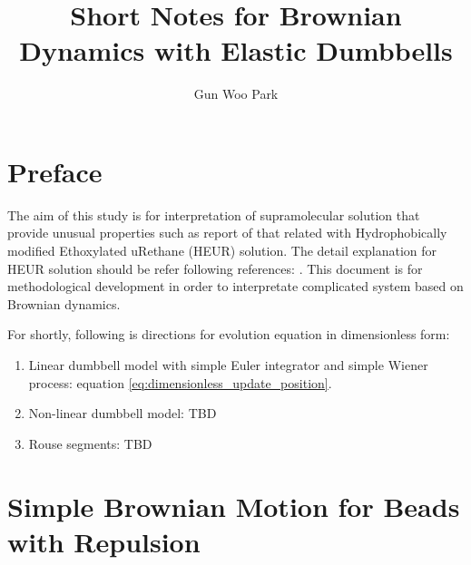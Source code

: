 \documentclass[10pt, a4paper]{article}
\title{Short Notes for Brownian Dynamics with Elastic Dumbbells}
\author{Gun Woo Park}
\begin{document}
\maketitle 

\section{Preface}
The aim of this study is for interpretation of supramolecular solution that provide unusual properties such as report of \textcite{Suzuki:2012gf} that related with Hydrophobically modified Ethoxylated uRethane (HEUR) solution. The detail explanation for HEUR solution should be refer following references: \textcite{Suzuki:2013kk, Uneyama:2012ge, Suzuki:2012gf}. This document is for methodological development in order to interpretate complicated system based on Brownian dynamics. 

For shortly, following is directions for evolution equation in dimensionless form:
\begin{enumerate}
\item Linear dumbbell model with simple Euler integrator and simple Wiener process: equation \eqref{eq:dimensionless_update_position}.
\item Non-linear dumbbell model: TBD
\item Rouse segments: TBD
\end{enumerate}

\section{Simple Brownian Motion for Beads with Repulsion}
\end{document}
